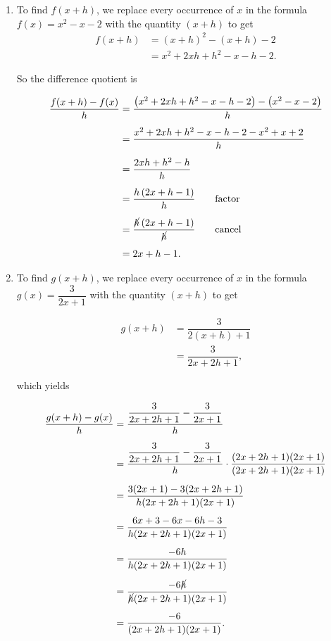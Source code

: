 {
\begin{enumerate}

\item To find $f(x+h)$, we replace every occurrence of $x$ in the formula\\
 $f(x) = x^2-x-2$ with the quantity $(x+h)$ to get 
\begin{align*} 
 f(x+h) & =  (x+h)^2 - (x+h) -2  \\
 & =  x^2 + 2xh + h^2 - x - h - 2.
\end{align*}

So the difference quotient is

\begin{align*}
\dfrac{f(x+h)-f(x)}{h} & = \dfrac{\left(x^2+2xh+h^2-x-h-2 \right)-\left(x^{2}-x-2 \right)}{h} \\[5pt] 
& = \dfrac{x^2+2xh+h^2-x-h-2-x^2+x+2}{h}\\[5pt]
& = \dfrac{2xh+h^2-h}{h}\\[5pt]
& = \dfrac{h \left(2x+h-1\right)}{h} \tag*{factor} \\[5pt]
& = \dfrac{\cancel{h} \left(2x+h-1\right)}{\cancel{h}} \tag*{cancel} \\[5pt]
& = 2x+h-1.
\end{align*}


\item To find $g(x+h)$, we replace every occurrence of $x$ in the formula\\ $g(x) = \dfrac{3}{2x+1}$ with the quantity $(x+h)$ to get 

\begin{align*}
 g(x+h) & =  \dfrac{3}{2(x+h)+1}  \\[5pt]
 & =  \dfrac{3}{2x+2h+1}, 
\end{align*}

which yields 

\begin{align*}
\dfrac{g(x+h)-g(x)}{h} & = \dfrac{\dfrac{3}{2x+2h+1}-\dfrac{3}{2x+1}}{h}\\[5pt]
& = \dfrac{\dfrac{3}{2x+2h+1}-\dfrac{3}{2x+1}}{h} \cdot \dfrac{(2x+2h+1)(2x+1)}{(2x+2h+1)(2x+1)}\\[5pt]
& = \dfrac{3(2x+1)-3(2x+2h+1)}{h(2x+2h+1)(2x+1)} \\[5pt]
& = \dfrac{6x+3-6x-6h-3}{h(2x+2h+1)(2x+1)}\\[5pt]
& = \dfrac{-6h}{h(2x+2h+1)(2x+1)}\\[5pt]
& = \dfrac{-6\cancel{h}}{\cancel{h}(2x+2h+1)(2x+1)}\\[5pt]
& = \dfrac{-6}{(2x+2h+1)(2x+1)}.
\end{align*}


\end{enumerate}}
